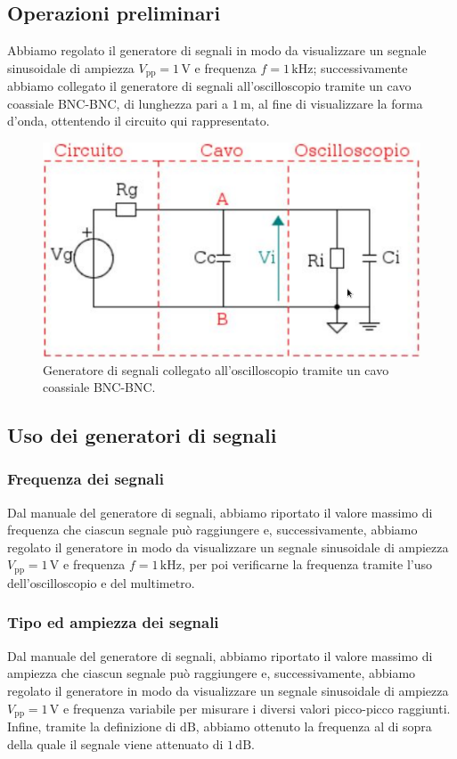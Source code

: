 \documentclass{article}
\begin{document}
		\subsection{Operazioni preliminari}
			Abbiamo regolato il generatore di segnali in modo da visualizzare un segnale sinusoidale di ampiezza $ V_{\mathrm{pp}} = 1 \, \mathrm{V} $ e frequenza $ f = 1 \, \mathrm{kHz} $; successivamente abbiamo collegato il generatore di segnali all'oscilloscopio tramite un cavo coassiale BNC-BNC, di lunghezza pari a $ 1 \, \mathrm{m} $, al fine di visualizzare la forma d'onda, ottentendo il circuito qui rappresentato.
			\begin{figure}[h!]
				\centering
				\includegraphics[scale=0.4]{theveninCavoDSO}
				\caption{Generatore di segnali collegato all'oscilloscopio tramite un cavo coassiale BNC-BNC.}
				\label{fig:theveninCavoDSO}
			\end{figure}
		\subsection{Uso dei generatori di segnali}
			\subsubsection{Frequenza dei segnali}
				Dal manuale del generatore di segnali, abbiamo riportato il valore massimo di frequenza che ciascun segnale può raggiungere e, successivamente, abbiamo regolato il generatore in modo da visualizzare un segnale sinusoidale di ampiezza $ V_{\mathrm{pp}} = 1 \, \mathrm{V} $ e frequenza $ f = 1 \, \mathrm{kHz} $, per poi verificarne la frequenza tramite l'uso dell'oscilloscopio e del multimetro.
			\subsubsection{Tipo ed ampiezza dei segnali}
				Dal manuale del generatore di segnali, abbiamo riportato il valore massimo di ampiezza che ciascun segnale può raggiungere e, successivamente, abbiamo regolato il generatore in modo da visualizzare un segnale sinusoidale di ampiezza $ V_{\mathrm{pp}} = 1 \, \mathrm{V} $ e frequenza variabile per misurare i diversi valori picco-picco raggiunti.
				\newline
				Infine, tramite la definizione di $ \mathrm{dB} $, abbiamo ottenuto la frequenza al di sopra della quale il segnale viene attenuato di $ 1 \, \mathrm{dB} $.
\end{document}
